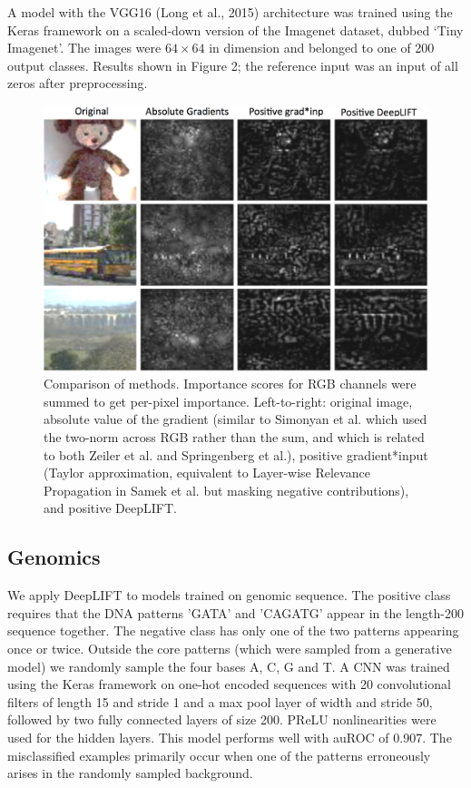 \documentclass{article}
\begin{document}
A model with the VGG16 (Long et al., 2015) architecture was trained using the Keras framework \citep{Chollet2015-ya} on a scaled-down version of the Imagenet dataset, dubbed `Tiny Imagenet'. The images were $64 \times 64$ in dimension and belonged to one of 200 output classes. Results shown in Figure 2; the reference input was an input of all zeros after preprocessing.
\begin{figure}[!ht]
\begin{center}
\includegraphics[scale=0.3]{TinyImagenetDeepLIFT.png}
\caption{Comparison of methods. Importance scores for RGB channels were summed to get per-pixel importance. Left-to-right: original image, absolute value of the gradient (similar to Simonyan et al. which used the two-norm across RGB rather than the sum, and which is related to both Zeiler et al. and Springenberg et al.), positive gradient*input (Taylor approximation, equivalent to Layer-wise Relevance Propagation in Samek et al. but masking negative contributions), and positive DeepLIFT.}
\end{center}
\vspace{-20px}
\end{figure}
\subsection{Genomics}
We apply DeepLIFT to models trained on genomic sequence. The positive class requires that the DNA patterns 'GATA' and 'CAGATG' appear in the length-200 sequence together. The negative class has only one of the two patterns appearing once or twice. Outside the core patterns (which were sampled from a generative model) we randomly sample the four bases A, C, G and T. A CNN was trained using the Keras framework \citep{Chollet2015-ya} on one-hot encoded sequences with 20 convolutional filters of length 15 and stride 1 and a max pool layer of width and stride 50, followed by two fully connected layers of size 200. PReLU nonlinearities were used for the hidden layers. This model performs well with auROC of 0.907. The misclassified examples primarily occur when one of the patterns erroneously arises in the randomly sampled background. %
\end{document}
